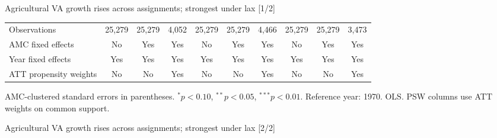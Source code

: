 \documentclass[aspectratio=169]{beamer}
\begin{document}
\begin{frame}{Agricultural VA growth rises across assignments; strongest under lax [1/2]}
{\begin{tabular}{@{}l*{9}{c}@{}}
\midrule
Observations & 25,279 & 25,279 & 4,052 & 25,279 & 25,279 & 4,466 & 25,279 & 25,279 & 3,473 \\
AMC fixed effects & No & Yes & Yes & No & Yes & Yes & No & Yes & Yes \\
Year fixed effects & Yes & Yes & Yes & Yes & Yes & Yes & Yes & Yes & Yes \\
ATT propensity weights & No & No & Yes & No & No & Yes & No & No & Yes \\
\bottomrule
\end{tabular}%
}
\vspace{0.1em}
{\tiny\color{ZMidGray} AMC-clustered standard errors in parentheses. $^{*}p<0.10$, $^{**}p<0.05$, $^{***}p<0.01$. Reference year: 1970. OLS. PSW columns use ATT weights on common support.}
\end{frame}
\begin{frame}{Agricultural VA growth rises across assignments; strongest under lax [2/2]}
\centering
\scriptsize
\setlength{\tabcolsep}{2.1pt}
\renewcommand{\arraystretch}{0.68}
\end{frame}
\end{document}
